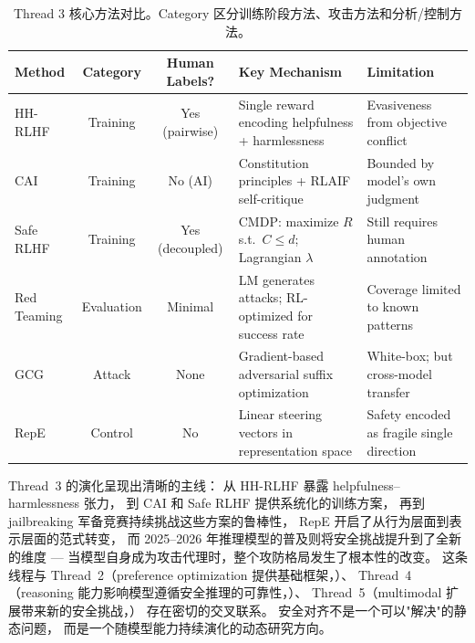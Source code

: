 \begin{table}[!ht]
\centering
\caption{Thread 3 核心方法对比。Category 区分训练阶段方法、攻击方法和分析/控制方法。}
\label{tab:safety-comparison}
\small
\begin{tabularx}{\textwidth}{l c c >{\raggedright\arraybackslash}X >{\raggedright\arraybackslash}X}
\toprule
\textbf{Method} & \textbf{Category} & \textbf{Human Labels?} & \textbf{Key Mechanism} & \textbf{Limitation} \\
\midrule
HH-RLHF & Training & Yes (pairwise) & Single reward encoding helpfulness + harmlessness & Evasiveness from objective conflict \\
CAI & Training & No (AI) & Constitution principles + RLAIF self-critique & Bounded by model's own judgment \\
Safe RLHF & Training & Yes (decoupled) & CMDP: maximize $R$ s.t.\ $C \leq d$; Lagrangian $\lambda$ & Still requires human annotation \\
Red Teaming & Evaluation & Minimal & LM generates attacks; RL-optimized for success rate & Coverage limited to known patterns \\
GCG & Attack & None & Gradient-based adversarial suffix optimization & White-box; but cross-model transfer \\
RepE & Control & No & Linear steering vectors in representation space & Safety encoded as fragile single direction \\
\bottomrule
\end{tabularx}
\end{table}

Thread~3 的演化呈现出清晰的主线：
从 HH-RLHF 暴露 helpfulness--harm\-less\-ness 张力，
到 CAI 和 Safe RLHF 提供系统化的训练方案，
再到 jailbreaking 军备竞赛持续挑战这些方案的鲁棒性，
RepE 开启了从行为层面到表示层面的范式转变，
而 2025--2026 年推理模型的普及则将安全挑战提升到了全新的维度 ---
当模型自身成为攻击代理时，整个攻防格局发生了根本性的改变。
这条线程与 Thread~2（preference optimization 提供基础框架，）、
Thread~4（reasoning 能力影响模型遵循安全推理的可靠性，）、
Thread~5（multimodal 扩展带来新的安全挑战，）
存在密切的交叉联系。
安全对齐不是一个可以"解决"的静态问题，
而是一个随模型能力持续演化的动态研究方向。
